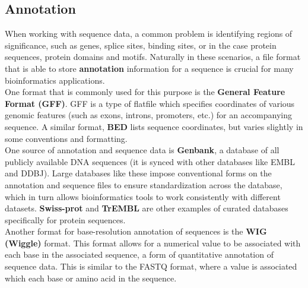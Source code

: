 \documentclass[12pt]{article}
\begin{document}
\subsection{Annotation}
When working with sequence data, a common problem is identifying regions of significance, such as genes, splice sites, binding sites, or in the case protein sequences, protein domains and motifs. Naturally in these scenarios, a file format that is able to store \textbf{annotation} information for a sequence is crucial for many bioinformatics applications. \\[10pt]
One format that is commonly used for this purpose is the {\bf General Feature Format (GFF)}. GFF is a type of flatfile which specifies coordinates of various genomic features (such as exons, introns, promoters, etc.) for an accompanying sequence. A similar format, {\bf BED} lists sequence coordinates, but varies slightly in some conventions and formatting.\\[10pt]
One source of annotation and sequence data is {\bf Genbank}, a database of all publicly available DNA sequences (it is synced with other databases like EMBL and DDBJ). Large databases like these impose conventional forms on the annotation and sequence files to ensure standardization across the database, which in turn allows bioinformatics tools to work consistently with different datasets. {\bf Swiss-prot} and {\bf TrEMBL} are other examples of curated databases specifically for protein sequences. \\[10pt]
Another format for base-resolution annotation of sequences is the {\bf WIG (Wiggle)} format. This format allows for a numerical value to be associated with each base in the associated sequence, a form of quantitative annotation of sequence data. This is similar to the FASTQ format, where a value is associated which each base or amino acid in the sequence.
\end{document}
